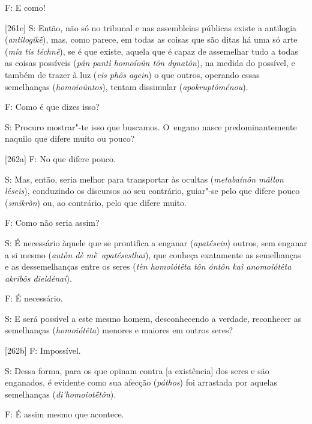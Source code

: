 F: E como!

 

[261e] S: Então, não só no tribunal e nas assembleias públicas
existe a antilogia (\emph{antilogikḕ}), mas, como parece, em todas as
coisas que são ditas há uma só arte (\emph{mía tis téchnê}), se é que
existe, aquela que é capaz de assemelhar tudo a todas as coisas
possíveis (\emph{pân pantì homoíoûn tôn dynatôn}), na medida do
possível, e também de trazer à luz (\emph{eis phôs agein}) o que outros,
operando essas semelhanças (\emph{homoioûntos}), tentam dissimular
(\emph{apokruptôménou}).

 

F: Como é que dizes isso?

 

S: Procuro mostrar"-te isso que buscamos. O~engano nasce
predominantemente naquilo que difere muito ou pouco?

 

[262a] F: No que difere pouco.

 

S: Mas, então, seria melhor para transportar às ocultas (\emph{metabaínôn
mâllon lḗseis}), conduzindo os discursos ao seu contrário, guiar"-se pelo
que difere pouco (\emph{smikròn}) ou, ao contrário, pelo que difere
muito.

 

F: Como não seria assim?

 

S: É necessário àquele que se prontifica a enganar (\emph{apatḗsein})
outros, sem enganar a si mesmo (\emph{autòn dè mḕ~apatḗsesthai}), que
conheça exatamente as semelhanças e as dessemelhanças entre os seres
(\emph{tèn homoiótêta tôn óntôn kaì anomoiótêta akribôs dieidénai}).

 

F: É necessário.

 

S: E será possível a este mesmo homem, desconhecendo a verdade,
reconhecer as semelhanças (\emph{homoiótêta}) menores e maiores em
outros seres?

 

[262b] F: Impossível.

 

S: Dessa forma, para os que opinam contra [a existência] dos seres e
são enganados, é evidente como sua afecção (\emph{páthos}) foi arrastada
por aquelas semelhanças (\emph{di'homoiotḗtôn}).

 

F: É assim mesmo que acontece.


